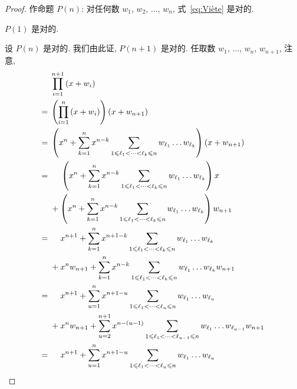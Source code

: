 \documentclass[../libro.tex]{subfiles}
\begin{document}
\begin{proof}
    作命题 \(P(n)\):
    对任何数 \(w_1\), \(w_2\), \(\dots\), \(w_n\),
    式~\eqref{eq:Viète} 是对的.

    \(P(1)\) 是对的.

    设 \(P(n)\) 是对的.
    我们由此证, \(P(n+1)\) 是对的.
    任取数 \(w_1\), \(\dots\), \(w_n\), \(w_{n+1}\),
    注意,
    \begin{align*}
        &
        \prod_{i = 1}^{n+1} {(x + w_i)}
        \\
        = {} &
        \left(\prod_{i = 1}^{n} {(x + w_i)}\right) (x + w_{n+1})
        \\
        = {} &
        \left(x^n + \sum_{k = 1}^{n} {x^{n-k}
                \sum_{1 \leq \ell_1 < \dots < \ell_k \leq n}
                {w_{\ell_1} \dots w_{\ell_k}}
        }\right) (x + w_{n+1})
        \\
        = {} &
        \hphantom{{} + {}}
        \left(x^n + \sum_{k = 1}^{n} {x^{n-k}
                \sum_{1 \leq \ell_1 < \dots < \ell_k \leq n}
                {w_{\ell_1} \dots w_{\ell_k}}
        }\right) x
        \\
        &
        {} +
        \left(x^n + \sum_{k = 1}^{n} {x^{n-k}
                \sum_{1 \leq \ell_1 < \dots < \ell_k \leq n}
                {w_{\ell_1} \dots w_{\ell_k}}
        }\right) w_{n+1}
        \\
        = {} &
        \hphantom{{} + {}}
        x^{n+1} + \sum_{k = 1}^{n} {x^{n+1-k}
            \sum_{1 \leq \ell_1 < \dots < \ell_k \leq n}
            {w_{\ell_1} \dots w_{\ell_k}}
        }
        \\
        &
        {} +
        x^n w_{n+1} + \sum_{k = 1}^{n} {x^{n-k}
            \sum_{1 \leq \ell_1 < \dots < \ell_k \leq n}
            {w_{\ell_1} \dots w_{\ell_k} w_{n+1}}
        }
        \\
        = {} &
        \hphantom{{} + {}}
        x^{n+1} + \sum_{u = 1}^{n} {x^{n+1-u}
            \sum_{1 \leq \ell_1 < \dots < \ell_u \leq n}
            {w_{\ell_1} \dots w_{\ell_u}}
        }
        \\
        &
        {} +
        x^n w_{n+1} + \sum_{u = 2}^{n+1} {x^{n-(u-1)}
            \sum_{1 \leq \ell_1 < \dots < \ell_{u-1} \leq n}
            {w_{\ell_1} \dots w_{\ell_{u-1}} w_{n+1}}
        }
        \\
        = {} &
        \hphantom{{} + {}}
        x^{n+1} + \sum_{u = 1}^{n} {x^{n+1-u}
            \sum_{1 \leq \ell_1 < \dots < \ell_u \leq n}
            {w_{\ell_1} \dots w_{\ell_u}}
}
\end{align*}
\end{proof}
\end{document}
